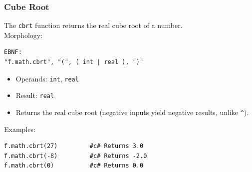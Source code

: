 \subsubsection{Cube Root}
The \texttt{cbrt} function returns the real cube root of a number.\\
Morphology:
\begin{verbatim}
EBNF:
"f.math.cbrt", "(", ( int | real ), ")"
\end{verbatim}
\begin{itemize}
\item Operands: \texttt{int}, \texttt{real}
\item Result: \texttt{real}
\item Returns the real cube root (negative inputs yield negative results, unlike \texttt{\^{}}).
\end{itemize}
Examples:
\begin{verbatim}
f.math.cbrt(27)         #c# Returns 3.0
f.math.cbrt(-8)         #c# Returns -2.0
f.math.cbrt(0)          #c# Returns 0.0
\end{verbatim}

